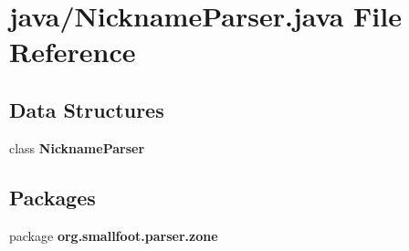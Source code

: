 \section{java/\-Nickname\-Parser.java File Reference}
\label{NicknameParser_8java}
\subsection*{Data Structures}
\begin{DoxyCompactItemize}
\item 
class {\bf Nickname\-Parser}
\end{DoxyCompactItemize}
\subsection*{Packages}
\begin{DoxyCompactItemize}
\item 
package {\bf org.\-smallfoot.\-parser.\-zone}
\end{DoxyCompactItemize}
